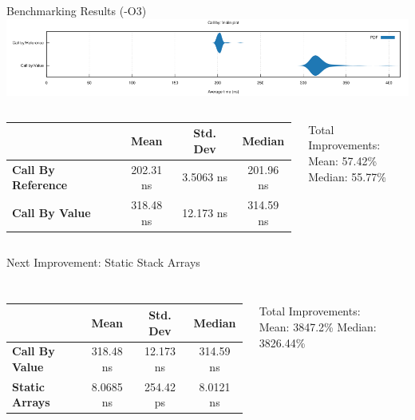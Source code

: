 \documentclass[compress,aspectratio=169]{beamer}
\begin{document}
\begin{frame}{Benchmarking Results (-O3)}
    \includegraphics[width=\textwidth]{./assets/first_violin.png}
  \begin{columns}
    \begin{column}{0.7\textwidth}
  \begin{table}[h]
\centering
\begin{tabular}{|l|c|c|c|}
\hline
& \textbf{Mean} & \textbf{Std. Dev} & \textbf{Median} \\
\hline
\textbf{Call By Reference} & 202.31 ns & 3.5063 ns & 201.96 ns \\
\hline
\textbf{Call By Value} & 318.48 ns & 12.173 ns & 314.59 ns \\
\hline
\end{tabular}
\end{table}
    \end{column}
    \begin{column}{0.3\textwidth}
      Total Improvements:\\
      Mean: 57.42\%\\
      Median: 55.77\%
    \end{column}
  \end{columns}
\end{frame}

\begin{frame}[fragile]{Next Improvement: Static Stack Arrays}
  \begin{tcolorbox}[title=Static Stack Arrays]
    \footnotesize\inputminted[xleftmargin=1em,linenos]{rust}{./assets/less_heap_allocation.rs}
  \end{tcolorbox}
  \begin{columns}
    \begin{column}{0.7\textwidth}
  \begin{table}[h]
    \centering
    \begin{tabular}{|l|c|c|c|}
      \hline
      &\textbf{Mean} & \textbf{Std. Dev} & \textbf{Median}\\
      \hline
      \textbf{Call By Value} & 318.48 ns & 12.173 ns & 314.59 ns \\
      \hline
      \textbf{Static Arrays} & 8.0685 ns & 254.42 ps & 8.0121 ns\\
      \hline
      \end{tabular}
  \end{table}
    \end{column}
    \begin{column}{0.3\textwidth}
      Total Improvements:\\
      Mean: 3847.2\%
      Median: 3826.44\%\\
    \end{column}
  \end{columns}
\end{frame}
\end{document}
